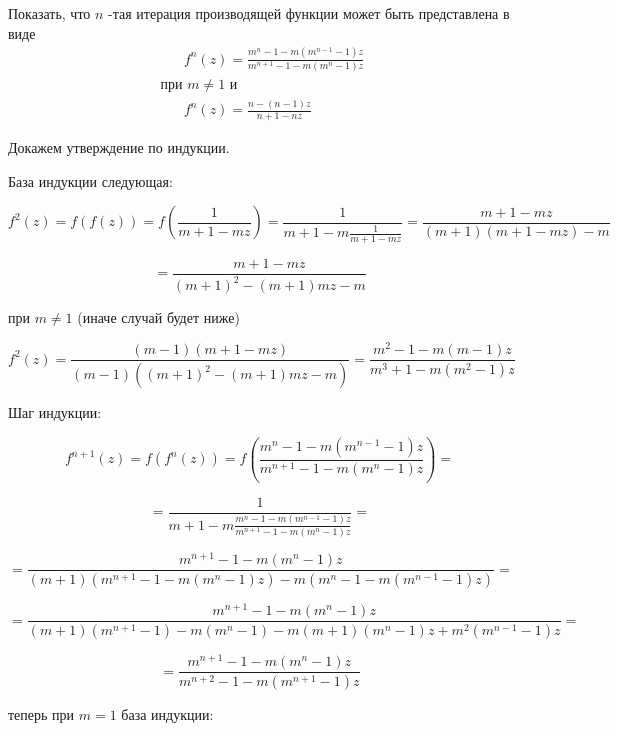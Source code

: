 \documentclass[a4paper,12pt]{article} %
\begin{document}
\begin{example}
Показать, что $n$ -тая итерация производящей функции может быть представлена в виде
\begin{equation}
\begin{array}{l}
\qquad f^{n}(z)=\frac{m^{n}-1-m\left(m^{n-1}-1\right) z}{m^{n+1}-1-m\left(m^{n}-1\right) z} \\
\text { при } m \neq 1 \text { и } \\
\qquad f^{n}(z)=\frac{n-(n-1) z}{n+1-n z}
\end{array}
\end{equation}


Докажем утверждение по индукции.


База индукции следующая:

\[ f^{2}(z)=f(f(z))=
f\left(\frac{1}{m+1-m z}\right)
=
\frac{1}{m+1-m \frac{1}{m+1-m z}}
=
\frac{m+1-m z}{(m+1)(m+1-m z)-m} \]

\[= \frac{m+1-m z}{(m+1)^{2}-(m+1) m z-m} \]



при $ m\ne 1 $ (иначе случай будет ниже)


\[ f^{2}(z)
=
\frac{(m-1)(m+1-m z)}{(m-1)\left((m+1)^{2}-(m+1) m z-m\right)}
=
\frac{m^{2}-1-m(m-1) z}{m^{3}+1-m\left(m^{2}-1\right) z} \]




Шаг индукции:


$$
f^{n+1}(z)=f\left(f^{n}(z)\right)=f\left(\frac{m^{n}-1-m\left(m^{n-1}-1\right) z}{m^{n+1}-1-m\left(m^{n}-1\right) z}\right)=
$$



$$
=\frac{1}{m+1-m \frac{m^{n}-1-m\left(m^{n-1}-1\right) z}{m^{n+1}-1-m\left(m^{n}-1\right) z}}=
$$



$$
=\frac{m^{n+1}-1-m\left(m^{n}-1\right) z}{(m+1)\left(m^{n+1}-1-m\left(m^{n}-1\right) z\right)-m\left(m^{n}-1-m\left(m^{n-1}-1\right) z\right)}=
$$



$$
=\frac{m^{n+1}-1-m\left(m^{n}-1\right) z}{(m+1)\left(m^{n+1}-1\right)-m\left(m^{n}-1\right)-m(m+1)\left(m^{n}-1\right) z+m^{2}\left(m^{n-1}-1\right) z}=
$$


$$
=\frac{m^{n+1}-1-m\left(m^{n}-1\right) z}{m^{n+2}-1-m\left(m^{n+1}-1\right) z}
$$









теперь при $ m=1 $ база индукции:



\end{example}
\end{document}
